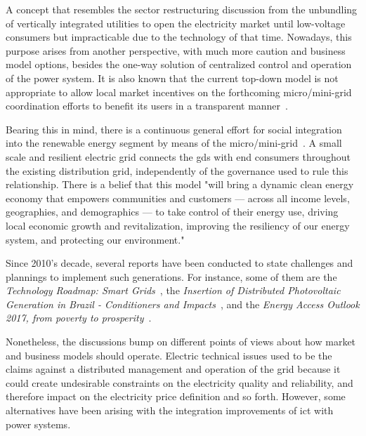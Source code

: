 A concept that resembles the sector restructuring discussion from the unbundling of vertically integrated utilities to open the electricity market until low-voltage consumers but impracticable due to the technology of that time.
Nowadays, this purpose arises from another perspective, with much more caution and business model options, besides the one-way solution of centralized control and operation of the power system.
It is also known that the current top-down model is not appropriate to allow local market incentives on the forthcoming micro/mini-grid coordination efforts to benefit its users in a transparent manner~\cite{kamphuis2008}.

Bearing this in mind,
there is a continuous general effort for social integration into the renewable energy segment by means of the micro/mini-grid~\cite{Jiayi2008}.
A small scale and resilient electric grid connects the \glspl{gd} with end consumers throughout the existing distribution grid, independently of the governance used to rule this relationship.
There is a belief that this model
"will bring a dynamic clean energy economy that empowers communities and customers — across all income levels, geographies, and demographics — to take control of their energy use, driving local economic growth and revitalization, improving the resiliency of our energy system, and protecting our environment."~\cite{masiello2016}

Since 2010's decade, several reports have been conducted to state challenges and plannings to implement such generations.
For instance, some of them are
the \emph{Technology Roadmap: Smart Grids}~\cite{iea2011},
the \emph{Insertion of Distributed Photovoltaic Generation in Brazil - Conditioners and Impacts}~\cite{epe2014}, and
the \emph{Energy Access Outlook 2017, from poverty to prosperity}~\cite{IEA2017}.

Nonetheless, the discussions bump on different points of views about how market and business models should operate.
Electric technical issues used to be the claims against a distributed management and operation of the grid because it could create undesirable constraints on the electricity quality and reliability,
and therefore impact on the electricity price definition and so forth.
However, some alternatives have been arising with the integration improvements of \gls{ict} with power systems.

